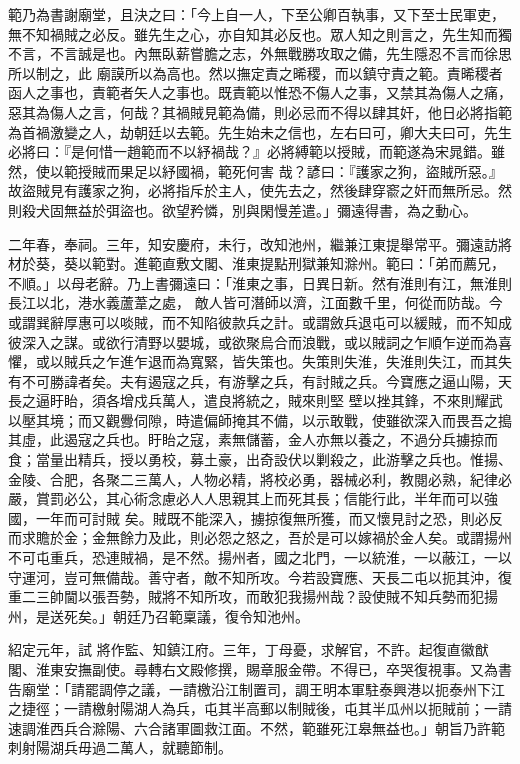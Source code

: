 \begin{pinyinscope}
 範乃為書謝廟堂，且決之曰：「今上自一人，下至公卿百執事，又下至士民軍吏，無不知禍賊之必反。雖先生之心，亦自知其必反也。眾人知之則言之，先生知而獨不言，不言誠是也。內無臥薪嘗膽之志，外無戰勝攻取之備，先生隱忍不言而徐思所以制之，此
 廟謨所以為高也。然以撫定責之晞稷，而以鎮守責之範。責晞稷者函人之事也，責範者矢人之事也。既責範以惟恐不傷人之事，又禁其為傷人之痛，惡其為傷人之言，何哉？其禍賊見範為備，則必忌而不得以肆其奸，他日必將指範為首禍激變之人，劫朝廷以去範。先生始未之信也，左右曰可，卿大夫曰可，先生必將曰：『是何惜一趙範而不以紓禍哉？』必將縛範以授賊，而範遂為宋晁錯。雖然，使以範授賊而果足以紓國禍，範死何害
 哉？諺曰：『護家之狗，盜賊所惡。』故盜賊見有護家之狗，必將指斥於主人，使先去之，然後肆穿窬之奸而無所忌。然則殺犬固無益於弭盜也。欲望矜憐，別與閑慢差遣。」彌遠得書，為之動心。



 二年春，奉祠。三年，知安慶府，未行，改知池州，繼兼江東提舉常平。彌遠訪將材於葵，葵以範對。進範直敷文閣、淮東提點刑獄兼知滁州。範曰：「弟而薦兄，不順。」以母老辭。乃上書彌遠曰：「淮東之事，日異日新。然有淮則有江，無淮則長江以北，港水義蘆葦之處，
 敵人皆可潛師以濟，江面數千里，何從而防哉。今或謂巽辭厚惠可以啖賊，而不知陷彼款兵之計。或謂斂兵退屯可以緩賊，而不知成彼深入之謀。或欲行清野以嬰城，或欲聚烏合而浪戰，或以賊詞之乍順乍逆而為喜懼，或以賊兵之乍進乍退而為寬緊，皆失策也。失策則失淮，失淮則失江，而其失有不可勝諱者矣。夫有遏寇之兵，有游擊之兵，有討賊之兵。今寶應之逼山陽，天長之逼盱眙，須各增戍兵萬人，遣良將統之，賊來則堅
 壁以挫其鋒，不來則耀武以壓其境；而又觀釁伺隙，時遣偏師掩其不備，以示敢戰，使雖欲深入而畏吾之搗其虛，此遏寇之兵也。盱眙之寇，素無儲蓄，金人亦無以養之，不過分兵擄掠而食；當量出精兵，授以勇校，募土豪，出奇設伏以剿殺之，此游擊之兵也。惟揚、金陵、合肥，各聚二三萬人，人物必精，將校必勇，器械必利，教閱必熟，紀律必嚴，賞罰必公，其心術念慮必人人思親其上而死其長；信能行此，半年而可以強國，一年而可討賊
 矣。賊既不能深入，擄掠復無所獲，而又懷見討之恐，則必反而求贍於金；金無餘力及此，則必怨之怒之，吾於是可以嫁禍於金人矣。或謂揚州不可屯重兵，恐連賊禍，是不然。揚州者，國之北門，一以統淮，一以蔽江，一以守運河，豈可無備哉。善守者，敵不知所攻。今若設寶應、天長二屯以扼其沖，復重二三帥閫以張吾勢，賊將不知所攻，而敢犯我揚州哉？設使賊不知兵勢而犯揚州，是送死矣。」朝廷乃召範稟議，復令知池州。



 紹定元年，試
 將作監、知鎮江府。三年，丁母憂，求解官，不許。起復直徽猷閣、淮東安撫副使。尋轉右文殿修撰，賜章服金帶。不得已，卒哭復視事。又為書告廟堂：「請罷調停之議，一請檄沿江制置司，調王明本軍駐泰興港以扼泰州下江之捷徑；一請檄射陽湖人為兵，屯其半高郵以制賊後，屯其半瓜州以扼賊前；一請速調淮西兵合滁陽、六合諸軍圖救江面。不然，範雖死江皋無益也。」朝旨乃許範刺射陽湖兵毋過二萬人，就聽節制。




\end{pinyinscope}

